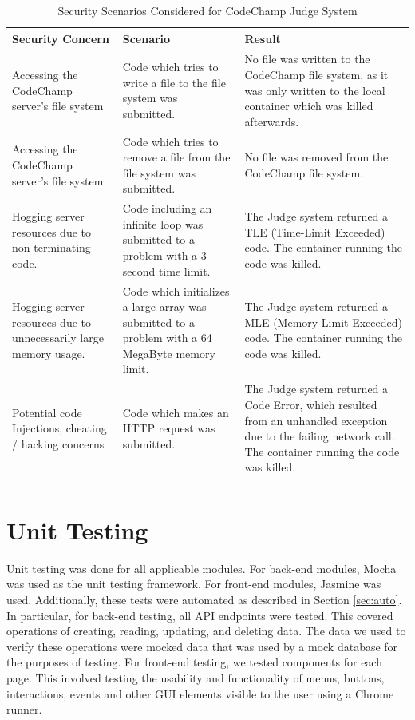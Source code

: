 \documentclass[12pt, titlepage]{article}
\begin{document}
\begin{longtable}{| p{3cm} | p{5.5cm} | p{5cm} |}
    \hline
    Security Concern & Scenario & Result\\
    \hline
    Accessing the CodeChamp server's file system & Code which tries to write a file to the file system was submitted. & No file was written to the CodeChamp file system, as it was only written to the local container which was killed afterwards.\\
    \hline
    Accessing the CodeChamp server's file system & Code which tries to remove a file from the file system was submitted. & No file was removed from the CodeChamp file system.\\
    \hline
    Hogging server resources due to non-terminating code. & Code including an infinite loop was submitted to a problem with a 3 second time limit. & The Judge system returned a TLE (Time-Limit Exceeded) code. The container running the code was killed. \\
    \hline
    Hogging server resources due to  unnecessarily large memory usage. & Code which initializes a large array was submitted to a problem with a 64 MegaByte memory limit. & The Judge system returned a MLE (Memory-Limit Exceeded) code. The container running the code was killed. \\
     \hline
     Potential code Injections, cheating / hacking concerns & Code which makes an HTTP request was submitted. & The Judge system returned a Code Error, which resulted from an unhandled exception due to the failing network call. The container running the code was killed. \\
     \hline
    \caption{Security Scenarios Considered for CodeChamp Judge System}
    \label{tab:Security}
\end{longtable}

\section{Unit Testing}

Unit testing was done for all applicable modules. For back-end modules, Mocha was used as the unit testing framework. For front-end modules, Jasmine was used. Additionally, these tests were automated as described in Section \ref{sec:auto}. In particular, for back-end testing, all API endpoints were tested. This covered operations of creating, reading, updating, and deleting data. The data we used to verify these operations were mocked data that was used by a mock database for the purposes of testing. For front-end testing, we tested components for each page. This involved testing the usability and functionality of menus, buttons, interactions, events and other GUI elements visible to the user using a Chrome runner.
\end{document}
